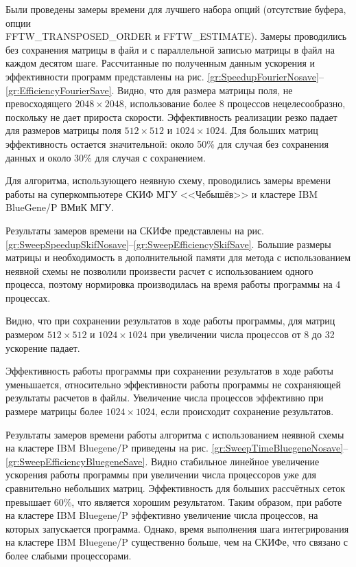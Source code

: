 Были проведены замеры времени для лучшего набора опций (отсутствие буфера, опции \\ FFTW\_TRANSPOSED\_ORDER и FFTW\_ESTIMATE).
Замеры проводились без сохранения матрицы в файл и с параллельной записью матрицы в файл на каждом десятом шаге.
Рассчитанные по полученным данным ускорения и эффективности программ представлены на рис. \ref{gr:SpeedupFourierNosave}--\ref{gr:EfficiencyFourierSave}.
Видно, что для размера матрицы поля, не превосходящего $2048\times2048$, использование более 8 процессов нецелесообразно, поскольку не дает прироста скорости.
Эффективность реализации резко падает для размеров матрицы поля $512\times512$ и $1024\times1024$.
Для больших матриц эффективность остается значительной: около 50\% для случая без сохранения данных и около 30\% для случая с сохранением.

Для алгоритма, использующего неявную схему, проводились замеры времени работы на суперкомпьютере СКИФ МГУ <<Чебышёв>> и кластере IBM BlueGene/P ВМиК МГУ.

Результаты замеров времени на СКИФе представлены на рис. \ref{gr:SweepSpeedupSkifNosave}--\ref{gr:SweepEfficiencySkifSave}.
Большие размеры матрицы и необходимость в дополнительной памяти для метода с использованием неявной схемы не позволили произвести расчет с использованием одного процесса,
поэтому нормировка производилась на время работы программы на 4 процессах.

Видно, что при сохранении результатов в ходе работы программы, для матриц размером $512\times512$ и $1024\times1024$ при увеличении числа процессов от 8 до 32 ускорение падает.

Эффективность работы программы при сохранении результатов в ходе работы уменьшается, относительно эффективности работы программы не сохраняющей результаты расчетов в файлы.
Увеличение числа процессов эффективно при размере матрицы более $1024\times1024$, если происходит сохранение результатов.

Результаты замеров времени работы алгоритма с использованием неявной схемы на кластере IBM Bluegene/P приведены на рис. \ref{gr:SweepTimeBluegeneNosave}--\ref{gr:SweepEfficiencyBluegeneSave}.
Видно стабильное линейное увеличение ускорения работы программы при увеличении числа процессоров уже для сравнительно небольших матриц.
Эффективность для больших рассчётных сеток превышает 60\%, что является хорошим результатом.
Таким образом, при работе на кластере IBM Bluegene/P эффективно увеличение числа процессов, на которых запускается программа.
Однако, время выполнения шага интегрирования на кластере IBM Bluegene/P существенно больше, чем на СКИФе, что связано с более слабыми процессорами.
